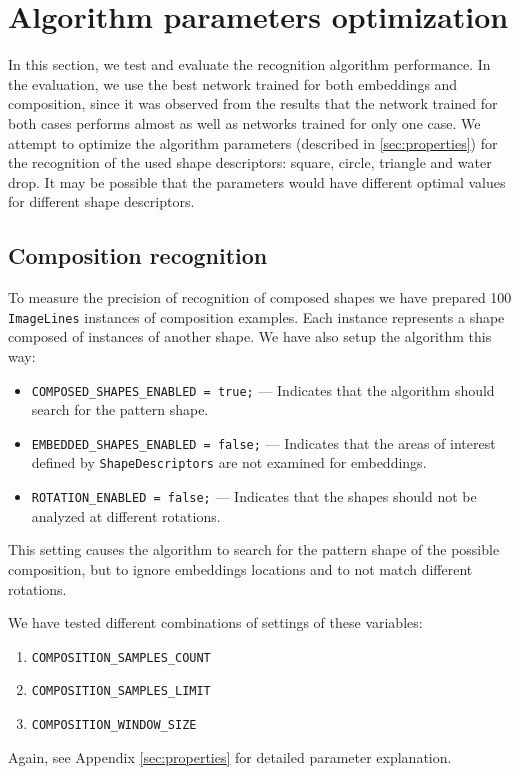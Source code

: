 \section{Algorithm parameters optimization}
In this section, we test and evaluate the recognition algorithm performance. In the evaluation, we use the best network trained for both embeddings and composition, since it was observed from the results that the network trained for both cases performs almost as well as networks trained for only one case. We attempt to optimize the algorithm parameters (described in \cref{sec:properties}) for the recognition of the used shape descriptors: square, circle, triangle and water drop. It may be possible that the parameters would have different optimal values for different shape descriptors.

\subsection{Composition recognition}
To measure the precision of recognition of composed shapes we have prepared 100 \texttt{ImageLines} instances of composition examples. Each instance represents a shape composed of instances of another shape. We have also setup the algorithm this way:
\begin{itemize}
\item \texttt{COMPOSED\_SHAPES\_ENABLED = true;} --- Indicates that the algorithm should search for the pattern shape.
\item \texttt{EMBEDDED\_SHAPES\_ENABLED = false;} --- Indicates that the areas of interest defined by \texttt{ShapeDescriptors} are not examined for embeddings.
\item \texttt{ROTATION\_ENABLED = false;} --- Indicates that the shapes should not be analyzed at different rotations.
\end{itemize}
This setting causes the algorithm to search for the pattern shape of the possible composition, but to ignore embeddings locations and to not match different rotations.

We have tested different combinations of settings of these variables:
\begin{enumerate}
\item \texttt{COMPOSITION\_SAMPLES\_COUNT}
\item \texttt{COMPOSITION\_SAMPLES\_LIMIT}
\item \texttt{COMPOSITION\_WINDOW\_SIZE} 
\end{enumerate} Again, see Appendix \cref{sec:properties} for detailed parameter explanation.

